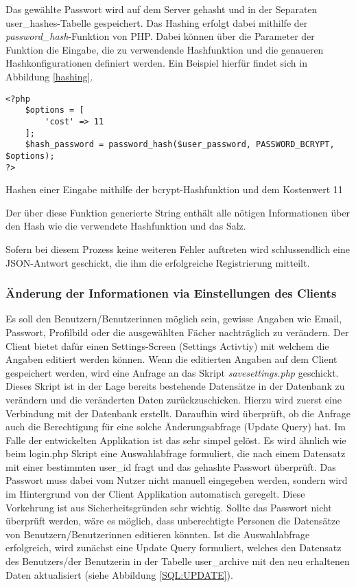 \documentclass[../main.tex]{subfiles}
\begin{document}
	 Das gewählte Passwort wird auf dem Server gehasht und in der Separaten user\_hashes-Tabelle gespeichert. Das Hashing erfolgt dabei mithilfe der \emph{password\_hash}-Funktion von PHP. Dabei können über die Parameter der Funktion die Eingabe, die zu verwendende Hashfunktion und die genaueren Hashkonfigurationen definiert werden. Ein Beispiel hierfür findet sich in Abbildung \ref{hashing}.
	 \begin{code}
	 	\begin{center}
	 		\begin{verbatim}
<?php
	$options = [
		'cost' => 11
	];
	$hash_password = password_hash($user_password, PASSWORD_BCRYPT, $options);
?>	
	 		\end{verbatim}
	 		\caption{Hashen einer Eingabe mithilfe der bcrypt-Hashfunktion und dem Kostenwert 11}\label{hashing}
	 	\end{center}
	 \end{code}	
	 Der über diese Funktion generierte String enthält alle nötigen Informationen über den Hash wie die verwendete Hashfunktion und das Salz.
	 
	 Sofern bei diesem Prozess keine weiteren Fehler auftreten wird schlussendlich eine JSON-Antwort geschickt, die ihm die erfolgreiche Registrierung mitteilt.
	 
	 \subsubsection{Änderung der Informationen via Einstellungen des Clients}
	 Es soll den Benutzern/Benutzerinnen möglich sein, gewisse Angaben wie Email, Passwort, Profilbild oder die ausgewählten Fächer nachträglich zu verändern. Der Client bietet dafür einen Settings-Screen (Settings Activtiy) mit welchem die Angaben editiert werden können. Wenn die editierten Angaben auf dem Client gespeichert werden, wird eine Anfrage an das Skript \emph{savesettings.php} geschickt. Dieses Skript ist in der Lage bereits bestehende Datensätze in der Datenbank zu verändern und die veränderten Daten zurückzuschicken. Hierzu wird zuerst eine Verbindung mit der Datenbank erstellt. Daraufhin wird überprüft, ob die Anfrage auch die Berechtigung für eine solche Änderungsabfrage (Update Query) hat. Im Falle der entwickelten Applikation ist das sehr simpel gelöst. Es wird ähnlich wie beim login.php Skript eine Auswahlabfrage formuliert, die nach einem Datensatz mit einer bestimmten user\_id fragt und das gehashte Passwort überprüft. Das Passwort muss dabei vom Nutzer nicht manuell eingegeben werden, sondern wird im Hintergrund von der Client Applikation automatisch geregelt. Diese Vorkehrung ist aus Sicherheitsgründen sehr wichtig. Sollte das Passwort nicht überprüft werden, wäre es möglich, dass unberechtigte Personen die Datensätze von Benutzern/Benutzerinnen editieren könnten. Ist die Auswahlabfrage erfolgreich, wird zunächst eine Update Query formuliert, welches den Datensatz des Benutzers/der Benutzerin in der Tabelle user\_archive mit den neu erhaltenen Daten aktualisiert (siehe Abbildung \ref{SQL:UPDATE}).
	 
\end{document}

